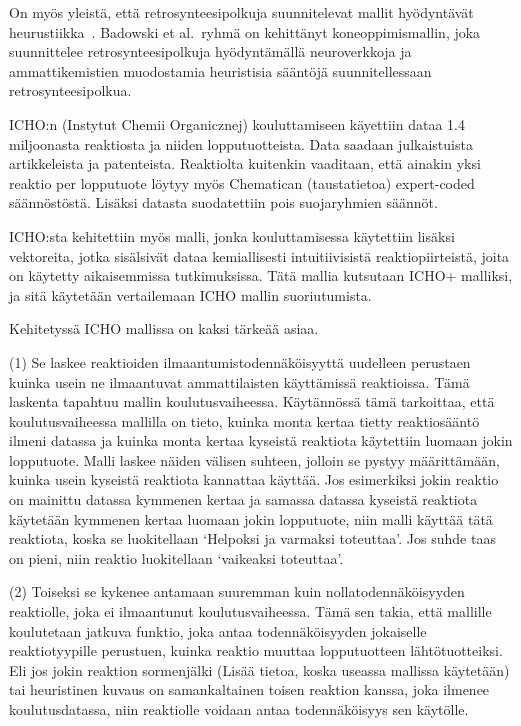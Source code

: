 \documentclass[finnish,twoside,censored,tkt,sw-line]{HYthesisML}
\begin{document}
On myös yleistä, että retrosynteesipolkuja suunnitelevat mallit hyödyntävät heurustiikka~\cite{ExpertKnowledgeRetorsynthesis}.
Badowski et al.\ ryhmä on kehittänyt koneoppimismallin, joka suunnittelee retrosynteesipolkuja hyödyntämällä neuroverkkoja ja ammattikemistien muodostamia heuristisia sääntöjä suunnitellessaan retrosynteesipolkua.

ICHO:n (Instytut Chemii Organicznej) kouluttamiseen käyettiin dataa 1.4 miljoonasta reaktiosta ja niiden lopputuotteista.
Data saadaan julkaistuista artikkeleista ja patenteista.
Reaktiolta kuitenkin vaaditaan, että ainakin yksi reaktio per lopputuote löytyy myös Chematican (taustatietoa) expert-coded säännöstöstä.
Lisäksi datasta suodatettiin pois suojaryhmien säännöt.

ICHO:sta kehitettiin myös malli, jonka kouluttamisessa käytettiin lisäksi vektoreita, jotka sisälsivät dataa kemiallisesti intuitiivisistä reaktiopiirteistä, joita on käytetty aikaisemmissa tutkimuksissa.
Tätä mallia kutsutaan ICHO+ malliksi, ja sitä käytetään vertailemaan ICHO mallin suoriutumista.

Kehitetyssä ICHO mallissa on kaksi tärkeää asiaa.

(1) Se laskee reaktioiden ilmaantumistodennäköisyyttä uudelleen perustaen kuinka usein ne ilmaantuvat ammattilaisten käyttämissä reaktioissa.
Tämä laskenta tapahtuu mallin koulutusvaiheessa.
Käytännössä tämä tarkoittaa, että koulutusvaiheessa mallilla on tieto, kuinka monta kertaa tietty reaktiosääntö ilmeni datassa ja kuinka monta kertaa kyseistä reaktiota käytettiin luomaan jokin lopputuote.
Malli laskee näiden välisen suhteen, jolloin se pystyy määrittämään, kuinka usein kyseistä reaktiota kannattaa käyttää.
Jos esimerkiksi jokin reaktio on mainittu datassa kymmenen kertaa ja samassa datassa kyseistä reaktiota käytetään kymmenen kertaa luomaan jokin lopputuote, niin malli käyttää tätä reaktiota, koska se luokitellaan `Helpoksi ja varmaksi toteuttaa'.
Jos suhde taas on pieni, niin reaktio luokitellaan `vaikeaksi toteuttaa'.

(2) Toiseksi se kykenee antamaan suuremman kuin nollatodennäköisyyden reaktiolle, joka ei ilmaantunut koulutusvaiheessa.
Tämä sen takia, että mallille koulutetaan jatkuva funktio, joka antaa todennäköisyyden jokaiselle reaktiotyypille perustuen, kuinka reaktio muuttaa lopputuotteen lähtötuotteiksi.
Eli jos jokin reaktion sormenjälki (Lisää tietoa, koska useassa mallissa käytetään) tai heuristinen kuvaus on samankaltainen toisen reaktion kanssa, joka ilmenee koulutusdatassa, niin reaktiolle voidaan antaa todennäköisyys sen käytölle.
\end{document}
